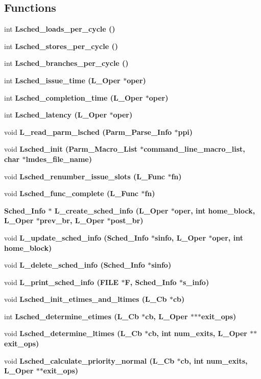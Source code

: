 \subsection*{Functions}
\begin{CompactItemize}
\item 
int \bf{Lsched\_\-loads\_\-per\_\-cycle} ()
\item 
int \bf{Lsched\_\-stores\_\-per\_\-cycle} ()
\item 
int \bf{Lsched\_\-branches\_\-per\_\-cycle} ()
\item 
int \bf{Lsched\_\-issue\_\-time} (L\_\-Oper $\ast$oper)
\item 
int \bf{Lsched\_\-completion\_\-time} (L\_\-Oper $\ast$oper)
\item 
int \bf{Lsched\_\-latency} (L\_\-Oper $\ast$oper)
\item 
void \bf{L\_\-read\_\-parm\_\-lsched} (\bf{Parm\_\-Parse\_\-Info} $\ast$ppi)
\item 
void \bf{Lsched\_\-init} (\bf{Parm\_\-Macro\_\-List} $\ast$command\_\-line\_\-macro\_\-list, char $\ast$lmdes\_\-file\_\-name)
\item 
void \bf{Lsched\_\-renumber\_\-issue\_\-slots} (L\_\-Func $\ast$fn)
\item 
void \bf{Lsched\_\-func\_\-complete} (L\_\-Func $\ast$fn)
\item 
\bf{Sched\_\-Info} $\ast$ \bf{L\_\-create\_\-sched\_\-info} (L\_\-Oper $\ast$oper, int home\_\-block, L\_\-Oper $\ast$prev\_\-br, L\_\-Oper $\ast$post\_\-br)
\item 
void \bf{L\_\-update\_\-sched\_\-info} (\bf{Sched\_\-Info} $\ast$sinfo, L\_\-Oper $\ast$oper, int home\_\-block)
\item 
void \bf{L\_\-delete\_\-sched\_\-info} (\bf{Sched\_\-Info} $\ast$sinfo)
\item 
void \bf{L\_\-print\_\-sched\_\-info} (FILE $\ast$\bf{F}, \bf{Sched\_\-Info} $\ast$s\_\-info)
\item 
void \bf{Lsched\_\-init\_\-etimes\_\-and\_\-ltimes} (L\_\-Cb $\ast$cb)
\item 
int \bf{Lsched\_\-determine\_\-etimes} (L\_\-Cb $\ast$cb, L\_\-Oper $\ast$$\ast$$\ast$exit\_\-ops)
\item 
void \bf{Lsched\_\-determine\_\-ltimes} (L\_\-Cb $\ast$cb, int num\_\-exits, L\_\-Oper $\ast$$\ast$exit\_\-ops)
\item 
void \bf{Lsched\_\-calculate\_\-priority\_\-normal} (L\_\-Cb $\ast$cb, int num\_\-exits, L\_\-Oper $\ast$$\ast$exit\_\-ops)
\item 

\end{CompactItemize}
